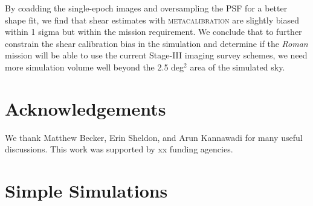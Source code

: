 \documentclass[fleqn,usenatbib]{mnras}
\begin{document}
By coadding the single-epoch images and oversampling the PSF for a better shape fit, we find that shear estimates with \textsc{metacalibration} are slightly biased within 1 sigma but within the mission requirement. We conclude that to further constrain the shear calibration bias in the simulation and determine if the \emph{Roman} mission will be able to use the current Stage-III imaging survey schemes, we need more simulation volume well beyond the 2.5 deg$^{2}$ area of the simulated sky. 



\section{Acknowledgements}

We thank Matthew Becker, Erin Sheldon, and Arun Kannawadi for many useful discussions. This work was supported by xx funding agencies.


 










\appendix

\section{Simple Simulations}
\label{app:coadd_F}
\end{document}
